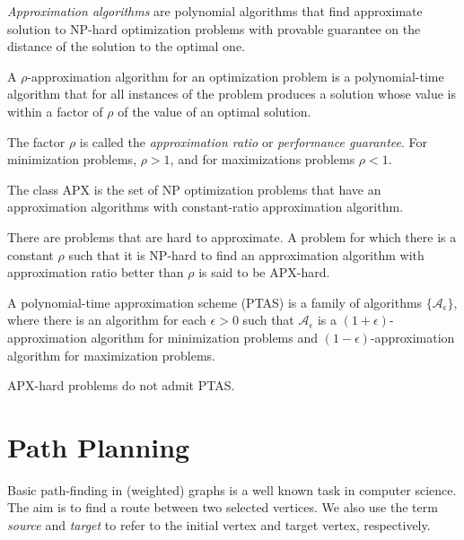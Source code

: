 \emph{Approximation algorithms} are polynomial algorithms that find approximate solution to NP-hard optimization problems with provable guarantee on the distance of the solution to the optimal one.
\begin{definition}\cite{williamson11}
A $\rho$-approximation algorithm for an optimization problem is a polynomial-time algorithm that for all instances of the problem produces a solution whose value is within a factor of
$\rho$ of the value of an optimal solution.
\end{definition}
The factor $\rho$ is called the \emph{approximation ratio} or \emph{performance guarantee}.
For minimization problems, $\rho > 1$, and for maximizations problems $\rho < 1$.
\begin{definition}
The class APX is the set of NP optimization problems that have an approximation algorithms with constant-ratio approximation algorithm.
\end{definition}
There are problems that are hard to approximate. 
A problem for which there is a constant $\rho$ such that it is NP-hard to find an approximation algorithm with approximation ratio better than $\rho$ is said to be APX-hard.
\begin{definition}\cite{williamson11}
A polynomial-time approximation scheme (PTAS) is a family of algorithms $\{\mathcal{A}_\epsilon\}$, where there is an algorithm for each $\epsilon > 0$ such that $\mathcal{A}_\epsilon$
is a $(1+\epsilon)$-approximation algorithm for minimization problems and $(1-\epsilon)$-approximation algorithm for maximization problems.
\end{definition}
\begin{proposition}
APX-hard problems do not admit PTAS.
\end{proposition}

\section{Path Planning}

Basic path-finding in (weighted) graphs is a well known task in computer science. The aim 
is to find a route between two selected vertices. We also use the term \emph{source} and
\emph{target} to refer to the initial vertex and target vertex, respectively.


